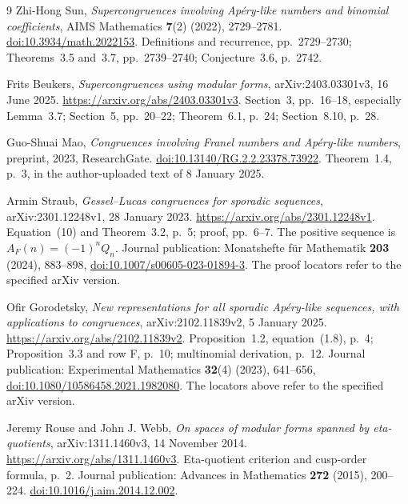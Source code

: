 \documentclass[11pt,a4paper]{article}
\theoremstyle{remark}
\begin{document}
\begingroup\small\raggedright
\begin{thebibliography}{9}
Zhi-Hong Sun,
\emph{Supercongruences involving Ap\'ery-like numbers and binomial coefficients},
AIMS Mathematics \textbf{7}(2) (2022), 2729--2781.
\href{https://doi.org/10.3934/math.2022153}{doi:10.3934/math.2022153}.
Definitions and recurrence, pp.~2729--2730;
Theorems~3.5 and~3.7, pp.~2739--2740;
Conjecture~3.6, p.~2742.

Frits Beukers,
\emph{Supercongruences using modular forms},
arXiv:2403.03301v3, 16 June 2025.
\url{https://arxiv.org/abs/2403.03301v3}.
Section~3, pp.~16--18, especially Lemma~3.7;
Section~5, pp.~20--22; Theorem~6.1, p.~24; Section~8.10, p.~28.

Guo-Shuai Mao,
\emph{Congruences involving Franel numbers and Ap\'ery-like numbers},
preprint, 2023, ResearchGate.
\href{https://doi.org/10.13140/RG.2.2.23378.73922}{doi:10.13140/RG.2.2.23378.73922}.
Theorem~1.4, p.~3, in the author-uploaded text of 8 January 2025.

Armin Straub,
\emph{Gessel--Lucas congruences for sporadic sequences},
arXiv:2301.12248v1, 28 January 2023.
\url{https://arxiv.org/abs/2301.12248v1}.
Equation~(10) and Theorem~3.2, p.~5; proof, pp.~6--7.
The positive sequence is $A_F(n)=(-1)^nQ_n$.
Journal publication: Monatshefte f\"ur Mathematik \textbf{203}
(2024), 883--898,
\href{https://doi.org/10.1007/s00605-023-01894-3}{doi:10.1007/s00605-023-01894-3}.
The proof locators refer to the specified arXiv version.

Ofir Gorodetsky,
\emph{New representations for all sporadic Ap\'ery-like sequences,
with applications to congruences},
arXiv:2102.11839v2, 5 January 2025.
\url{https://arxiv.org/abs/2102.11839v2}.
Proposition~1.2, equation~(1.8), p.~4;
Proposition~3.3 and row F, p.~10; multinomial derivation, p.~12.
Journal publication: Experimental Mathematics \textbf{32}(4)
(2023), 641--656,
\href{https://doi.org/10.1080/10586458.2021.1982080}{doi:10.1080/10586458.2021.1982080}.
The locators above refer to the specified arXiv version.

Jeremy Rouse and John J. Webb,
\emph{On spaces of modular forms spanned by eta-quotients},
arXiv:1311.1460v3, 14 November 2014.
\url{https://arxiv.org/abs/1311.1460v3}.
Eta-quotient criterion and cusp-order formula, p.~2.
Journal publication: Advances in Mathematics \textbf{272} (2015), 200--224.
\href{https://doi.org/10.1016/j.aim.2014.12.002}{doi:10.1016/j.aim.2014.12.002}.


\end{thebibliography}
\end{document}
